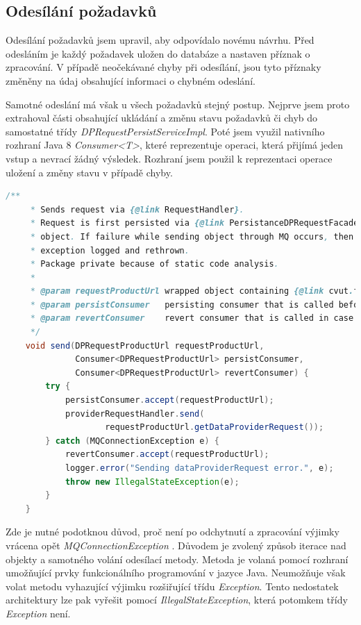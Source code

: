 \documentclass[thesis=B,czech]{FITthesis}[2012/06/26]
\begin{document}
\subsection{Odesílání požadavků}
Odesílání požadavků jsem upravil, aby odpovídalo novému návrhu. Před odesláním je každý požadavek uložen do databáze a nastaven
příznak o zpracování. V případě neočekávané chyby při odesílání, jsou tyto příznaky změněny na údaj obsahující informaci
o chybném odeslání.
\par
Samotné odeslání má však u všech požadavků stejný postup. Nejprve jsem proto extrahoval části obsahující ukládání a změnu stavu požadavků či chyb do samostatné třídy
\textit{DPRequestPersistServiceImpl}. Poté jsem využil nativního rozhraní Java 8 \textit{Consumer<T>}, které reprezentuje
operaci, která přijímá jeden vstup a nevrací žádný výsledek. Rozhraní jsem použil k reprezentaci operace uložení a
změny stavu v případě chyby.
\par
\begin{lstlisting}[language=Java, caption={Společná metoda zajišťující odeslání DataProvider požadavků}]
    /**
     * Sends request via {@link RequestHandler}.
     * Request is first persisted via {@link PersistanceDPRequestFacade} and it's id is set to the request in wrapper
     * object. If failure while sending object through MQ occurs, then {@link Consumer} failureHandler is called,
     * exception logged and rethrown.
     * Package private because of static code analysis.
     *
     * @param requestProductUrl wrapped object containing {@link cvut.fit.persistence.entity.ProductUrl}, {@link DataProviderRequest}
     * @param persistConsumer   persisting consumer that is called before sending
     * @param revertConsumer    revert consumer that is called in case of sending failure
     */
    void send(DPRequestProductUrl requestProductUrl,
              Consumer<DPRequestProductUrl> persistConsumer,
              Consumer<DPRequestProductUrl> revertConsumer) {
        try {
            persistConsumer.accept(requestProductUrl);
            providerRequestHandler.send(
                    requestProductUrl.getDataProviderRequest());
        } catch (MQConnectionException e) {
            revertConsumer.accept(requestProductUrl);
            logger.error("Sending dataProviderRequest error.", e);
            throw new IllegalStateException(e);
        }
    }
\end{lstlisting}


Zde je nutné podotknou důvod, proč není po odchytnutí a zpracování výjimky vrácena opět \textit{MQConnectionException} . 
Důvodem je zvolený způsob iterace nad objekty a samotného volání odesílací metody.
Metoda je volaná pomocí rozhraní umožňující prvky funkcionálního programování v jazyce Java. Neumožňuje však volat
metodu vyhazující výjimku rozšiřující třídu \textit{Exception}.
Tento nedostatek architektury lze pak vyřešit pomocí \textit{IllegalStateException}, která potomkem třídy \textit{Exception} není.
\par
\end{document}
